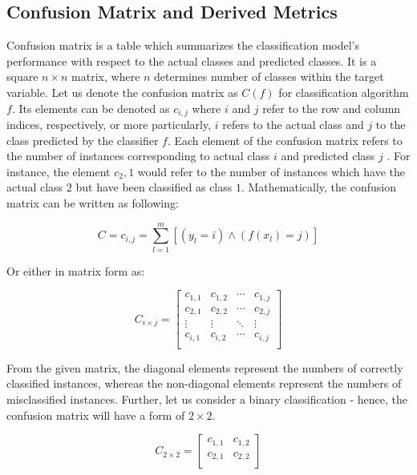 \subsection{Confusion Matrix and Derived Metrics}


Confusion matrix is a table which summarizes the classification model's performance with respect to the actual classes and predicted classes.
It is a square $n \times n$ matrix, where $n$ determines number of classes within the target variable.
Let us denote the confusion matrix as $C\left(f\right)$ for classification algorithm $f$. 
Its elements can be denoted as $c_{i,j}$ where $i$ and $j$ refer to the row and column indices, respectively, or more particularly, $i$ refers to the actual class and $j$ to the class predicted by the classifier $f$.
Each element of the confusion matrix refers to the number of instances corresponding to actual class $i$ and predicted class $j$ \citep{japkowicz2011evaluating}. For instance, the element $c_2,1$ would refer to the number of instances which have the actual class $2$ but have been classified as class $1$.
Mathematically, the confusion matrix can be written as following:

\begin{equation}\label{eq}
C = {c_{i,j} = \sum_{l=1}^{m}[(y_l=i) \land (f(x_l)=j)]}
\end{equation}

Or either in matrix form as:

\begin{equation}\label{eq}
    C_{i \times j} = \begin{bmatrix}
    c_{1,1} & c_{1,2} & \cdots & c_{1,j} \\
    c_{2,1} & c_{2,2} & \cdots & c_{2,j} \\
    \vdots & \vdots & \ddots & \vdots \\
    c_{i,1} & c_{i,2} & \cdots & c_{i,j} \\
    \end{bmatrix}
\end{equation}

From the given matrix, the diagonal elements represent the numbers of correctly classified instances, whereas the non-diagonal elements represent the numbers of misclassified instances.
Further, let us consider a binary classification - hence, the confusion matrix will have a form of $2\times 2$.

\begin{equation}
    C_{2 \times 2} = \begin{bmatrix}
    c_{1,1} & c_{1,2} \\
    c_{2,1} & c_{2,2} \\
    \end{bmatrix}
\end{equation}


